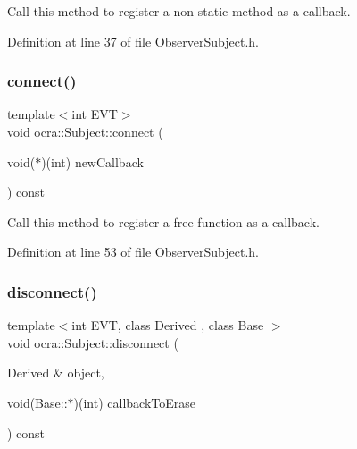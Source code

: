 Call this method to register a non-\/static method as a callback. 



Definition at line 37 of file Observer\+Subject.\+h.

\hypertarget{classocra_1_1Subject_a457978501a99ac43d2a8a03224f00ac5}{}\label{classocra_1_1Subject_a457978501a99ac43d2a8a03224f00ac5} 
\subsubsection{\texorpdfstring{connect()}{connect()}\hspace{0.1cm}{\footnotesize\ttfamily [2/2]}}
{\footnotesize\ttfamily template$<$int E\+VT$>$ \\
void ocra\+::\+Subject\+::connect (\begin{DoxyParamCaption}\item[{void($\ast$)(int)}]{new\+Callback }\end{DoxyParamCaption}) const\hspace{0.3cm}{\ttfamily [inline]}}



Call this method to register a free function as a callback. 



Definition at line 53 of file Observer\+Subject.\+h.

\hypertarget{classocra_1_1Subject_a6c96a103a782be401def25981d70c407}{}\label{classocra_1_1Subject_a6c96a103a782be401def25981d70c407} 
\subsubsection{\texorpdfstring{disconnect()}{disconnect()}\hspace{0.1cm}{\footnotesize\ttfamily [1/2]}}
{\footnotesize\ttfamily template$<$int E\+VT, class Derived , class Base $>$ \\
void ocra\+::\+Subject\+::disconnect (\begin{DoxyParamCaption}\item[{Derived \&}]{object,  }\item[{void(Base\+::$\ast$)(int)}]{callback\+To\+Erase }\end{DoxyParamCaption}) const\hspace{0.3cm}{\ttfamily [inline]}}



